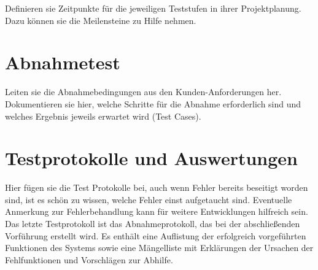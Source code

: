 Definieren sie Zeitpunkte für die jeweiligen Teststufen in ihrer
Projektplanung. Dazu können sie die Meilensteine zu Hilfe nehmen.

\section{Abnahmetest}

Leiten sie die Abnahmebedingungen aus den Kunden-Anforderungen her.
Dokumentieren sie hier, welche Schritte für die Abnahme erforderlich
sind und welches Ergebnis jeweils erwartet wird (Test Cases).

\section{Testprotokolle und Auswertungen}

Hier fügen sie die Test Protokolle bei, auch wenn Fehler bereits
beseitigt worden sind, ist es schön zu wissen, welche Fehler einst
aufgetaucht sind. Eventuelle Anmerkung zur Fehlerbehandlung kann für
weitere Entwicklungen hilfreich sein.
Das letzte Testprotokoll ist das Abnahmeprotokoll, das bei der
abschließenden Vorführung erstellt wird. Es enthält eine Auflistung der
erfolgreich vorgeführten Funktionen des Systems sowie eine Mängelliste
mit Erklärungen der Ursachen der Fehlfunktionen und Vorschlägen zur
Abhilfe.

